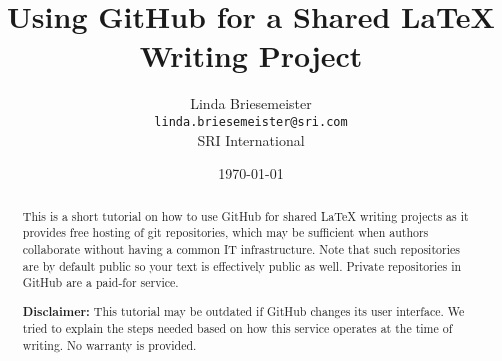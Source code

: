 \documentclass{article}
\title{Using GitHub\textsuperscript{\textcopyright} for a Shared \LaTeX{} Writing Project}
\author{%
Linda Briesemeister\\
\texttt{linda.briesemeister@sri.com}\\
SRI International
}
\date{\today}
\begin{document}
\maketitle

\begin{abstract}
This is a short tutorial on how to use GitHub for shared LaTeX writing projects as it provides free hosting of git repositories, which may be sufficient when authors collaborate without having a common IT infrastructure.  Note that such repositories are by default public so your text is effectively public as well.  Private repositories in GitHub are a paid-for service.

\textbf{Disclaimer:} This tutorial may be outdated if GitHub changes its user interface.  We tried to explain the steps needed based on how this service operates at the time of writing.  No warranty is provided.
\end{abstract}

\tableofcontents

\clearpage

\pagestyle{fancy}





%
%
%
\end{document}
